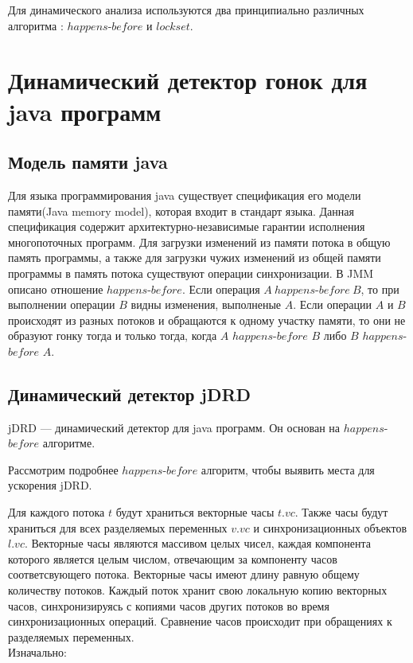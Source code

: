 Для динамического анализа используются два принципиально различных алгоритма : $happens$-$before$ и $lockset$\cite{DRD}.


\FloatBarrier
\section{Динамический детектор гонок для java программ}

\FloatBarrier
\subsection{Модель памяти java}
Для языка программирования java существует спецификация его модели памяти(Java memory model), которая входит в стандарт языка. Данная спецификация содержит архитектурно-независимые гарантии исполнения многопоточных программ.
Для загрузки изменений из памяти потока в общую память программы, а также для загрузки чужих изменений из общей памяти программы в память потока существуют операции синхронизации. В JMM описано отношение $happens$-$before$. Если операция $A\ happens$-$before\ B$, то при выполнении операции $B$ видны изменения, выполненые $A$. Если операции $A$ и $B$ происходят из разных потоков и обращаются к одному участку памяти, то они не образуют гонку тогда и только тогда, когда $A$ $happens$-$before$ $B$ либо $B$ $happens$-$before$ $A$\cite{JMM}.



\subsection{Динамический детектор jDRD}
jDRD --- динамический детектор для java программ. Он основан на $happens$-$before$ алгоритме. 

Рассмотрим подробнее $happens$-$before$ алгоритм, чтобы выявить места для ускорения jDRD.

Для каждого потока $t$ будут храниться векторные часы $t.vc$. Также часы будут храниться для всех разделяемых переменных $v.vc$ и синхронизационных объектов $l.vc$.
Векторные часы являются массивом целых чисел, каждая компонента которого является целым числом, отвечающим за компоненту часов соответсвующего потока. Векторные часы имеют длину равную общему количеству потоков. Каждый поток хранит свою локальную копию векторных часов, синхронизируясь с копиями часов других потоков во время синхронизационных операций.
Сравнение часов происходит при обращениях к разделяемых переменных.
\\Изначально:  

